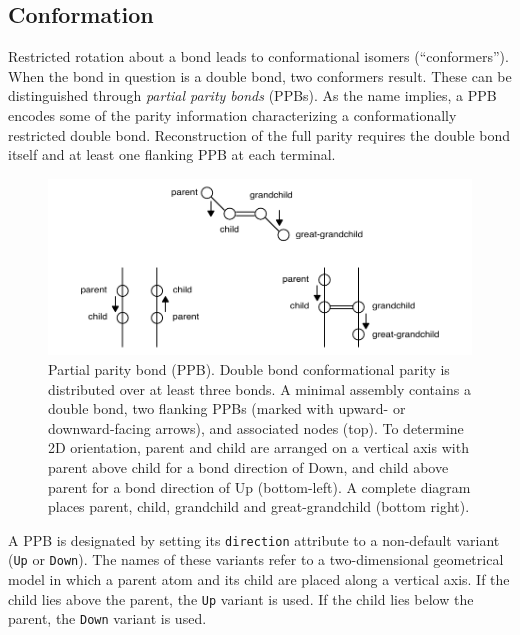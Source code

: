 \documentclass{article}
\def\ttt{\texttt}
\begin{document}
\subsection*{Conformation}
\label{conformation}

Restricted rotation about a bond leads to conformational isomers (\enquote{conformers}). When the bond in question is a double bond, two conformers result. These can be distinguished through \textit{partial parity bonds} (PPBs). As the name implies, a PPB encodes some of the parity information characterizing a conformationally restricted double bond. Reconstruction of the full parity requires the double bond itself and at least one flanking PPB at each terminal.

\begin{figure}
    \centering
    \includegraphics[width=\columnwidth]{partial-parity-bond.pdf}
    \caption{Partial parity bond (PPB). Double bond conformational parity is distributed over at least three bonds. A minimal assembly contains a double bond, two flanking PPBs (marked with upward- or downward-facing arrows), and associated nodes (top). To determine 2D orientation, parent and child are arranged on a vertical axis with parent above child for a bond direction of Down, and child above parent for a bond direction of Up (bottom-left). A complete diagram places parent, child, grandchild and great-grandchild (bottom right).}
    \label{fig:partial-parity-bonds}
\end{figure}

A PPB is designated by setting its \ttt{direction} attribute to a non-default variant (\ttt{Up} or \ttt{Down}). The names of these variants refer to a two-dimensional geometrical model in which a parent atom and its child are placed along a vertical axis. If the child lies above the parent, the \ttt{Up} variant is used. If the child lies below the parent, the \ttt{Down} variant is used.
\end{document}
